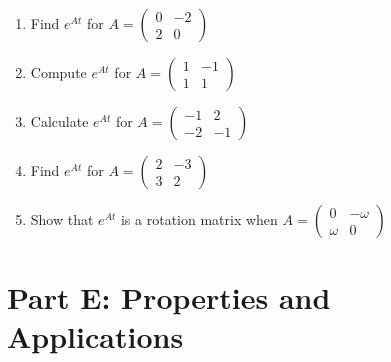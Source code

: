\documentclass[12pt]{article}
\begin{document}
\begin{enumerate}[start=16]
\item Find $e^{At}$ for $A = \begin{pmatrix} 0 & -2 \\ 2 & 0 \end{pmatrix}$

\item Compute $e^{At}$ for $A = \begin{pmatrix} 1 & -1 \\ 1 & 1 \end{pmatrix}$

\item Calculate $e^{At}$ for $A = \begin{pmatrix} -1 & 2 \\ -2 & -1 \end{pmatrix}$

\item Find $e^{At}$ for $A = \begin{pmatrix} 2 & -3 \\ 3 & 2 \end{pmatrix}$

\item Show that $e^{At}$ is a rotation matrix when $A = \begin{pmatrix} 0 & -\omega \\ \omega & 0 \end{pmatrix}$
\end{enumerate}

\section*{Part E: Properties and Applications}
\end{document}
